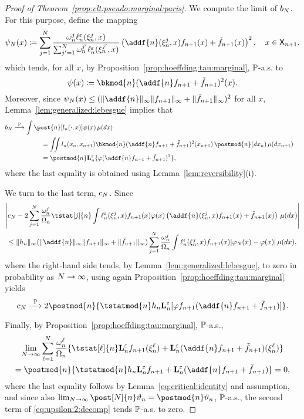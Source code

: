 \begin{proof}[Proof of Theorem~\ref{prop:clt:pseudo:marginal:paris}]
We compute the limit of $b_N$. For this purpose, define the mapping 
\[
 \psi_\N(x) \eqdef \sum_{j = 1}^\N \frac{\ewght{n}{j} \udmod{n}(\epart{n}{j}, x)}{\sum_{j' = 1}^\N \ewght{n}{j'} \udmod{n} (\epart{n}{j'}, x)} \left( \addf{n}(\epart{n}{j}, x) f_{n + 1}(x) + \ftd{n + 1}(x) \right)^2, \quad x \in \Xset_{n + 1}. 
\]
which tends, for all $x$, by Proposition~\ref{prop:hoeffding:tau:marginal}, $\mathbb{P}$-a.s. to 
$$
\psi(x) \eqdef \bkmod{n}(\addf{n} f_{n + 1} + \ftd{n + 1})^2(x). 
$$
Moreover, since $\psi_\N(x) \leq (\| \addf{n} \|_\infty \|f_{n + 1} \|_\infty + \| \ftd{n + 1} \|_\infty)^2$ for all $x$, Lemma~\ref{lem:generalized:lebesgue} implies that 
\begin{align*}
\lefteqn{b_\N \pplim \int \post{n} [\lwd{n}(\cdot, x)] \psi(x) \, \mu(\rmd x)} \hspace{20mm} \\
&= \iint \lwd{n}(x_n, x_{n + 1}) \bkmod{n}(\addf{n} f_{n + 1} + \ftd{n + 1})^2(x_{n + 1}) \, \postmod{n}(\rmd x_n) \, \mu(\rmd x_{n + 1}) \\
&= \postmod{n} \ukmod{n}\{ \varphi (\addf{n} f_{n + 1} + \ftd{n + 1})^2 \},  
\end{align*}
where the last equality is obtained using Lemma~\ref{lem:reversibility}(i).
 
We turn to the last term, $c_N$. Since 
\begin{multline*}
\left| c_\N -  2 \sum_{j = 1}^\N \frac{\ewght{n}{j}}{\sumwght{n}} \tstat[j]{n} \int \udmod{n} (\epart{n}{j}, x) f_{n + 1}(x) \varphi(x) \left( \addf{n}(\epart{n}{j} ,x) f_{n + 1}(x) + \ftd{n + 1}(x)\right) \, \mu(\rmd x) \right| \\
\leq \| h_n \|_{\infty}( \| \addf{n} \|_\infty \| f_{n + 1} \|_\infty + \| \ftd{n + 1} \|_\infty) \sum_{j = 1}^\N \frac{\ewght{n}{j}}{\sumwght{n}} \int \udmod{n}(\epart{n}{j}, x) f_{n + 1}(x) |\varphi_\N(x) - \varphi(x)| \, \mu(\rmd x),   
\end{multline*}
where the right-hand side tends, by Lemma~\ref{lem:generalized:lebesgue}, to zero in probability as $N \to \infty$, using again Proposition~\ref{prop:hoeffding:tau:marginal} yields
\[
c_\N \pplim 2 \postmod{n} \{ \tstatmod{n} h_n \ukmod{n} [\varphi f_{n + 1}( \addf{n} f_{n + 1} + \ftd{n +1})] \}. 
\]

Finally, by Proposition~\ref{prop:hoeffding:tau:marginal}, $\mathbb{P}$-a.s., 
\begin{multline} \label{eq:zero:limit}
\lim_{\N \to \infty} \sum_{\ell = 1}^N \frac{\ewght{n}{\ell}}{\sumwght{n}} \{ \tstat[\ell]{n} \ukmod{n} f_{n + 1}(\epart{n}{\ell}) + \ukmod{n}(\addf{n} f_{n + 1} + \ftd{n + 1})(\epart{n}{\ell}) \} \\
=  \postmod{n}\{ \tstatmod{n} h_n \ukmod{n} f_{n + 1} + \ukmod{n}(\addf{n} f_{n + 1} + \ftd{n + 1})\} = 0,
\end{multline}
where the last equality follows by Lemma~\ref{eq:critical:identity} and assumption, and since also $\lim_{\N \to \infty}\post[\N]{n} \adjfuncforward{n} = \postmod{n} \adjfuncforward{n}$, $\mathbb{P}$-a.s., the second term of \eqref{eq:upsilon:2:decomp} tends $\mathbb{P}$-a.s. to zero.   


\end{proof}
